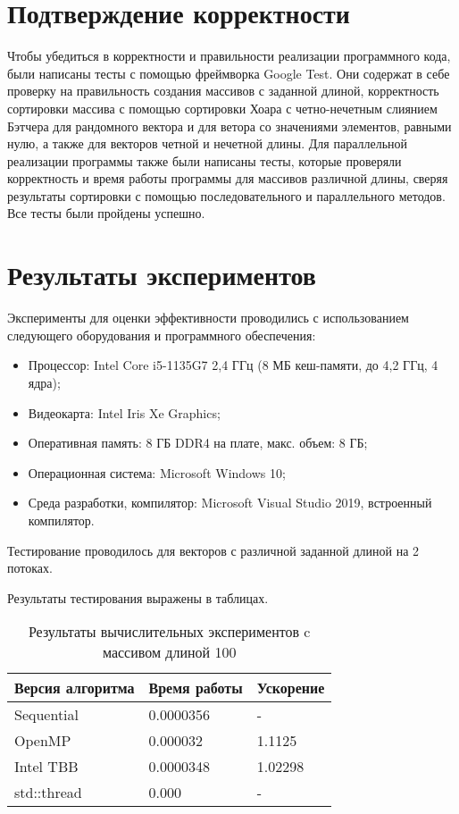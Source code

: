 \documentclass{report}
\begin{document}
\section*{Подтверждение корректности}
Чтобы убедиться в корректности и правильности реализации программного кода, были написаны тесты с помощью фреймворка Google Test. Они содержат в себе проверку на правильность создания массивов с заданной длиной, корректность сортировки массива с помощью сортировки Хоара с четно-нечетным слиянием Бэтчера для рандомного вектора и для ветора со значениями элементов, равными нулю, а также для векторов четной и нечетной длины. Для параллельной реализации программы также были написаны тесты, которые проверяли корректность и время работы программы для массивов различной длины, сверяя результаты сортировки с помощью последовательного и параллельного методов. Все тесты были пройдены успешно. 
\newpage

\section*{Результаты экспериментов}
\par Эксперименты для оценки эффективности проводились с использованием следующего оборудования и программного обеспечения:
\begin{itemize}
\item Процессор: Intel Core i5-1135G7 2,4 ГГц (8 МБ кеш-памяти, до 4,2 ГГц, 4 ядра);
\item Видеокарта: Intel Iris Xe Graphics;
\item Оперативная память: 8 ГБ DDR4 на плате, макс. объем: 8 ГБ;
\item Операционная система: Microsoft Windows 10;
\item Среда разработки, компилятор: Microsoft Visual Studio 2019, встроенный компилятор.
\end{itemize}
\par Тестирование проводилось для векторов с различной заданной длиной на 2 потоках.
\par Результаты тестирования выражены в таблицах.

\begin{table}[!h]
\caption{Результаты вычислительных экспериментов c массивом длиной 100}
\centering
\begin{tabular}{| p{5cm} | p{5cm} | p{5cm} |}
\hline
Версия алгоритма & Время работы & Ускорение  \\[5pt]
\hline
Sequential      & 0.0000356       & -             \\
OpenMP          & 0.000032        & 1.1125        \\
Intel TBB       & 0.0000348       & 1.02298       \\
std::thread     & 0.000           & -             \\
\hline
\end{tabular}
\end{table}
\end{document}
